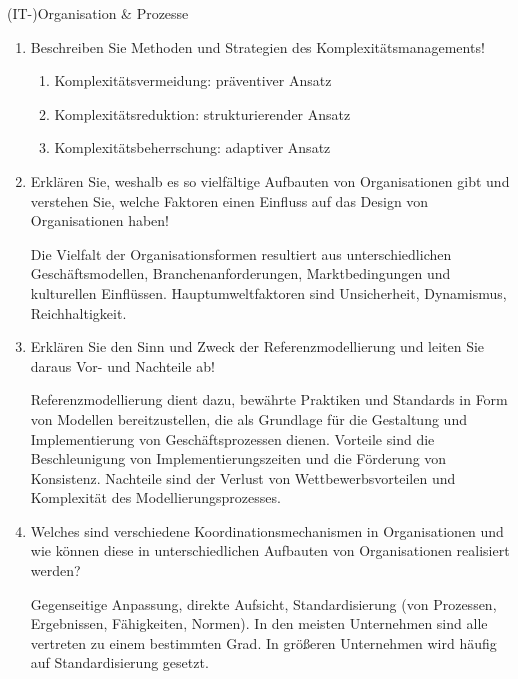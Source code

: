 \documentclass{article}
\begin{document}
\begin{exercise}{(IT-)Organisation \& Prozesse}
\begin{enumerate}
    \item Beschreiben Sie Methoden und Strategien des Komplexitätsmanagements!
          \begin{solution}
            \begin{enumerate}
              \item Komplexitätsvermeidung: präventiver Ansatz
              \item Komplexitätsreduktion: strukturierender Ansatz
              \item Komplexitätsbeherrschung: adaptiver Ansatz
            \end{enumerate}
          \end{solution}

    \item Erklären Sie, weshalb es so vielfältige Aufbauten von Organisationen gibt und verstehen Sie, welche Faktoren einen Einfluss auf das Design von Organisationen haben!
          \begin{solution}
            Die Vielfalt der Organisationsformen resultiert aus unterschiedlichen Geschäftsmodellen, Branchenanforderungen, Marktbedingungen und kulturellen Einflüssen. Hauptumweltfaktoren sind Unsicherheit, Dynamismus, Reichhaltigkeit.
          \end{solution}

    \item Erklären Sie den Sinn und Zweck der Referenzmodellierung und leiten Sie daraus Vor- und Nachteile ab!
          \begin{solution}
            Referenzmodellierung dient dazu, bewährte Praktiken und Standards in Form von Modellen bereitzustellen, die als Grundlage für die Gestaltung und Implementierung von Geschäftsprozessen dienen.
            Vorteile sind die Beschleunigung von Implementierungszeiten und die Förderung von Konsistenz.
            Nachteile sind der Verlust von Wettbewerbsvorteilen und Komplexität des Modellierungsprozesses.
          \end{solution}

    \item Welches sind verschiedene Koordinationsmechanismen in Organisationen und wie können diese in unterschiedlichen Aufbauten von Organisationen realisiert werden?
          \begin{solution}
            Gegenseitige Anpassung, direkte Aufsicht, Standardisierung (von Prozessen, Ergebnissen, Fähigkeiten, Normen). In den meisten Unternehmen sind alle vertreten zu einem bestimmten Grad. In größeren Unternehmen wird häufig auf Standardisierung gesetzt.
          \end{solution}


\end{enumerate}
\end{exercise}
\end{document}
